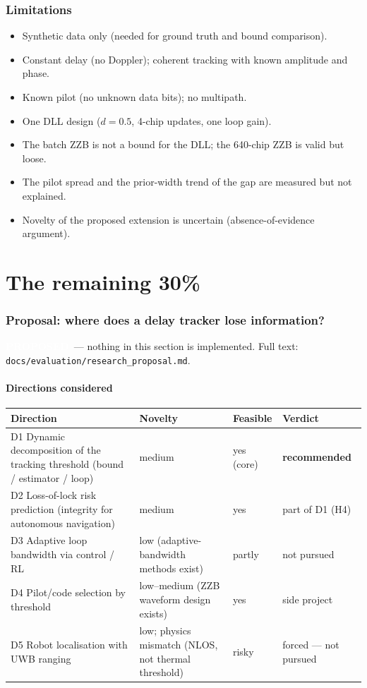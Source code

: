 \documentclass[11pt,a4paper]{article}
\newcommand{\prop}{\colorbox{violet!80!black}{\textcolor{white}{\scriptsize\bfseries PROPOSED}}}
\begin{document}
\section{Limitations}\label{sec:limits}
\begin{itemize}
\item Synthetic data only (needed for ground truth and bound comparison).
\item Constant delay (no Doppler); coherent tracking with known amplitude and phase.
\item Known pilot (no unknown data bits); no multipath.
\item One DLL design ($d=0.5$, 4-chip updates, one loop gain).
\item The batch ZZB is not a bound for the DLL; the 640-chip ZZB is valid but loose.
\item The pilot spread and the prior-width trend of the gap are measured but not explained.
\item Novelty of the proposed extension is uncertain (absence-of-evidence argument).
\end{itemize}

\part{The remaining 30\%}
\section{Proposal: where does a delay tracker lose information?}\label{sec:proposal}
\prop\ --- nothing in this section is implemented. Full text: \texttt{docs/evaluation/research\_proposal.md}.

\subsection{Directions considered}
\begin{center}
\begin{tabularx}{\textwidth}{>{\raggedright\arraybackslash}X>{\raggedright\arraybackslash}p{3.6cm}>{\raggedright\arraybackslash}p{2.0cm}>{\raggedright\arraybackslash}p{2.4cm}}
\toprule
\textbf{Direction} & \textbf{Novelty} & \textbf{Feasible} & \textbf{Verdict}\\
\midrule
D1 Dynamic decomposition of the tracking threshold (bound / estimator / loop) & medium & yes (core) & \textbf{recommended}\\
D2 Loss-of-lock risk prediction (integrity for autonomous navigation) & medium & yes & part of D1 (H4)\\
D3 Adaptive loop bandwidth via control / RL & low (adaptive-bandwidth methods exist) & partly & not pursued\\
D4 Pilot/code selection by threshold & low--medium (ZZB waveform design exists) & yes & side project\\
D5 Robot localisation with UWB ranging & low; physics mismatch (NLOS, not thermal threshold) & risky & forced --- not pursued\\
\bottomrule
\end{tabularx}
\end{center}
\end{document}

